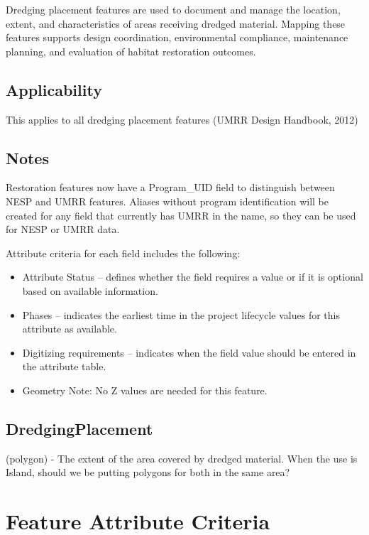 \documentclass[
  letterpaper,
  DIV=11,
  numbers=noendperiod]{scrreprt}
\providecommand{\tightlist}{%
  \setlength{\itemsep}{0pt}\setlength{\parskip}{0pt}}
\begin{document}
Dredging placement features are used to document and manage the
location, extent, and characteristics of areas receiving dredged
material. Mapping these features supports design coordination,
environmental compliance, maintenance planning, and evaluation of
habitat restoration outcomes.

\subsection{Applicability}\label{applicability-17}

This applies to all dredging placement features (UMRR Design Handbook,
2012)

\subsection{Notes}\label{notes-20}

Restoration features now have a Program\_UID field to distinguish
between NESP and UMRR features. Aliases without program identification
will be created for any field that currently has UMRR in the name, so
they can be used for NESP or UMRR data.

Attribute criteria for each field includes the following:

\begin{itemize}
\tightlist
\item
  Attribute Status -- defines whether the field requires a value or if
  it is optional based on available information.
\item
  Phases -- indicates the earliest time in the project lifecycle values
  for this attribute as available.
\item
  Digitizing requirements -- indicates when the field value should be
  entered in the attribute table.
\item
  Geometry Note: No Z values are needed for this feature.
\end{itemize}

\subsection{DredgingPlacement}\label{dredgingplacement}

(polygon) - The extent of the area covered by dredged material. When the
use is Island, should we be putting polygons for both in the same area?

\section{Feature Attribute
Criteria}\label{feature-attribute-criteria-17}
\end{document}

